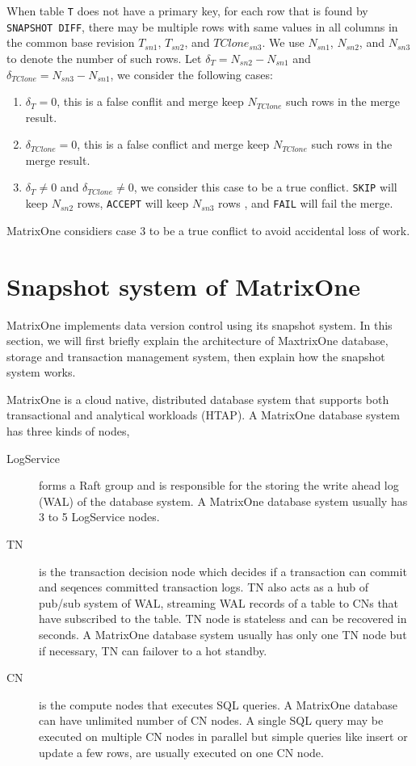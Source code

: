 \documentclass[sigconf,nonacm]{acmart} %
\begin{document}
When table \texttt{T} does not have a primary key, for each row that 
is found by \texttt{SNAPSHOT DIFF}, there may be multiple rows with 
same values in all columns in the common base revision $T_{sn1}$, 
$T_{sn2}$, and $TClone_{sn3}$.  
We use $N_{sn1}$, $N_{sn2}$, and $N_{sn3}$ to denote the number of 
such rows.  Let $\delta_T = N_{sn2} - N_{sn1}$ 
and $\delta_{TClone} = N_{sn3} - N_{sn1}$, we consider the following cases:
\begin{enumerate}
\item $\delta_T = 0$, this is a false conflit and 
merge keep $N_{TClone}$ such rows in the merge result.
\item $\delta_{TClone} = 0$, this is a false conflict and 
merge keep $N_{TClone}$ such rows in the merge result.
\item $\delta_T \neq 0$ and $\delta_{TClone} \neq 0$, we consider this
case to be a true conflict. \texttt{SKIP}
will keep $N_{sn2}$ rows, \texttt{ACCEPT} will keep $N_{sn3}$ rows
, and \texttt{FAIL} will fail the merge.
\end{enumerate}
MatrixOne considiers case 3 to be a true conflict to avoid
accidental loss of work.

\section{Snapshot system of MatrixOne}
MatrixOne implements data version control using its snapshot system.
In this section, we will first briefly explain the architecture of MaxtrixOne
database, storage and transaction management system,
then explain how the snapshot system works.

MatrixOne is a cloud native, distributed database system that supports 
both transactional and analytical workloads (HTAP).  A MatrixOne database 
system has three kinds of nodes, 
\begin{description}
\item[LogService] forms a Raft group and is responsible for the storing the write ahead log (WAL) 
of the database system.  A MatrixOne database system usually has 3 to 5 LogService nodes.
\item[TN] is the transaction decision node which decides if a transaction can commit and 
seqences committed transaction logs.  TN also acts as a hub of pub/sub system of WAL, streaming
WAL records of a table to CNs that have subscribed to the table.  TN node is stateless and can be recovered in seconds.  
A MatrixOne database system usually has only one TN node but if necessary, TN can failover 
to a hot standby. 
\item[CN] is the compute nodes that executes SQL queries.  A MatrixOne database can have unlimited
number of CN nodes.  A single SQL query may be executed on multiple CN nodes in parallel but 
simple queries like insert or update a few rows, are usually executed on one CN node.
\end{description}
\end{document}
